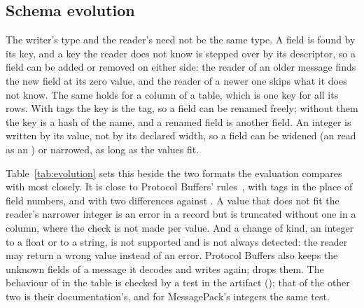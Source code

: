 \subsection{Schema evolution}
\label{sec:evolution}

The writer's type and the reader's need not be the same type. A field is
found by its key, and a key the reader does not know is stepped over by its
descriptor, so a field can be added or removed on either side: the reader
of an older message finds the new field at its zero value, and the reader of
a newer one skips what it does not know. The same holds for a column of a
table, which is one key for all its rows. With tags the key is the tag, so a
field can be renamed freely; without them the key is a hash of the name, and
a renamed field is another field. An integer is written by its value, not by
its declared width, so a field can be widened (an  read as an
) or narrowed, as long as the values fit.

Table~\ref{tab:evolution} sets this beside the two formats the evaluation
compares \colbin{} with most closely. It is close to Protocol Buffers'
rules~\cite{protobuf}, with tags in the place of field numbers, and with two
differences against \colbin{}. A value that does not fit the reader's
narrower integer is an error in a record but is truncated without one in a
column, where the check is not made per value. And a change of kind, an
integer to a float or to a string, is not supported and is not always
detected: the reader may return a wrong value instead of an error.
Protocol Buffers also keeps the unknown fields of a message it decodes and
writes again; \colbin{} drops them. The behaviour of \colbin{} in the table
is checked by a test in the artifact ();
that of the other two is their documentation's, and for MessagePack's
integers the same test.


